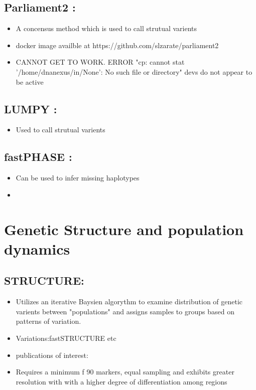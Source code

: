 \documentclass[document.tex]{subfiles}
\begin{document}
    \subsection{Parliament2 :}
    \begin{itemize}
    \item A concensus method which is used to call strutual varients
    \item docker image availble at https://github.com/slzarate/parliament2 
    \item CANNOT GET TO WORK. ERROR "cp: cannot stat '/home/dnanexus/in/None': No such file or directory" devs do not appear to be active
    \end{itemize}
    
    \subsection{LUMPY :}
    \begin{itemize}
    \item Used to call strutual varients 
    \end{itemize}

    \subsection{fastPHASE :\citetitle{}}
    \begin{itemize}
    \item Can be used to infer missing haplotypes
    \item 
    \end{itemize}

\section*{Genetic Structure and population dynamics}
    \subsection{STRUCTURE: }
        \begin{itemize}
        \item Utilizes an iterative Baysien algorythm to examine distribution of genetic 
        varients between "populations" and assigns samples to groups based on patterns of 
        variation.
        \item Variations:fastSTRUCTURE etc 
        \item publications of interest:
        \item Requires a minimum f 90 markers, equal sampling and exhibits greater resolution with with a higher degree of differentiation among regions \cite{nelson_2013}
        \end{itemize} 
\end{document}
